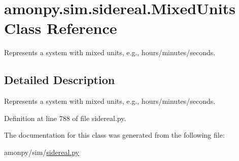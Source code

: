 \hypertarget{classamonpy_1_1sim_1_1sidereal_1_1_mixed_units}{\section{amonpy.\-sim.\-sidereal.\-Mixed\-Units Class Reference}
\label{classamonpy_1_1sim_1_1sidereal_1_1_mixed_units}
}


Represents a system with mixed units, e.\-g., hours/minutes/seconds.  




\subsection{Detailed Description}
Represents a system with mixed units, e.\-g., hours/minutes/seconds. 

Definition at line 788 of file sidereal.\-py.



The documentation for this class was generated from the following file\-:\begin{DoxyCompactItemize}
\item 
amonpy/sim/\hyperlink{sidereal_8py}{sidereal.\-py}\end{DoxyCompactItemize}

